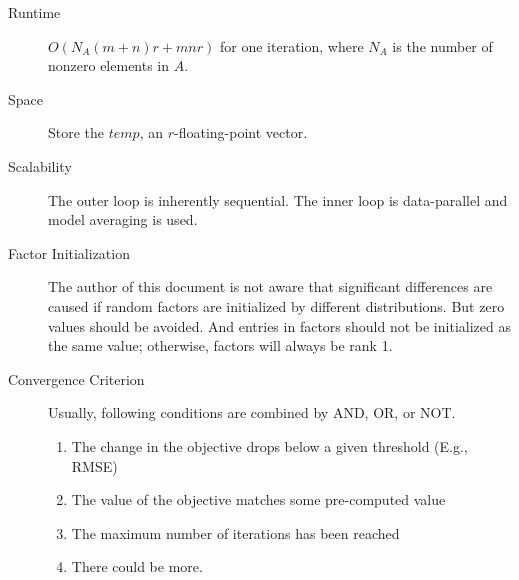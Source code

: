 \begin{description}
	\item[Runtime] $O(N_{A} (m + n) r + m n r)$ for one iteration,
        where $N_{A}$ is the number of nonzero elements in $A$.

	\item[Space] Store the $\mathit{temp}$, an $r$-floating-point vector.

	\item[Scalability] The outer loop is inherently sequential.
        The inner loop is data-parallel and model averaging 
        \cite{DBLP:conf/nips/DuchiAW10} is used.

    \item[Factor Initialization] The author of this document is not aware that
        significant differences are caused if random factors are initialized
        by different distributions. But zero values should be avoided. And
        entries in factors should not be initialized as the same value;
        otherwise, factors will always be rank 1.

    \item[Convergence Criterion] Usually, following conditions are combined by
        AND, OR, or NOT.
        \begin{enumerate}
            \item The change in the objective drops below a given threshold
                (E.g., RMSE)
            \item The value of the objective matches some pre-computed value
            \item The maximum number of iterations has been reached
            \item There could be more.
        \end{enumerate}
\end{description}
